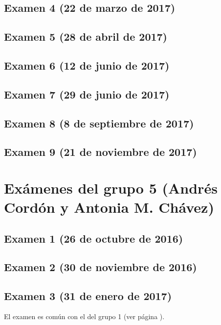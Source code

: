 \documentclass[a4paper,12pt,twoside]{book}
\begin{document}
\subsection{Examen 4 (22 de marzo de 2017)}
\subsection{Examen 5 (28 de abril de 2017)}
\subsection{Examen 6 (12 de junio de 2017)}
 \label{examen_16_17_4_6}
\subsection{Examen 7 (29 de junio de 2017)}
  \label{examen_16_17_4_7}
\subsection{Examen 8 (8 de septiembre de 2017)}
  \label{examen_16_17_4_8}
\subsection{Examen 9 (21 de noviembre de 2017)}
  \label{examen_16_17_4_9}

\section{Exámenes del grupo 5 (Andrés Cordón y Antonia M. Chávez)}
\subsection{Examen 1 (26 de octubre de 2016)}
\subsection{Examen 2 (30 de noviembre de 2016)}
\subsection{Examen 3 (31 de enero de 2017)}
El examen es común con el del grupo 1 (ver página \pageref{examen_16_17_1_3}).
\end{document}
